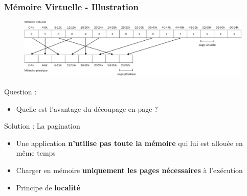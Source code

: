 \documentclass[8pt]{beamer}
\begin{document}
\begin{frame}[c]
    \frametitle{Mémoire Virtuelle - Illustration}
    \begin{figure}
        \centering

        \includegraphics[width=\textwidth]{figures/memoire_virtuelle_physique.pdf}
    \end{figure}
    \begin{alertblock}{Question : }
        \begin{itemize}
            \item
                  Quelle est l'avantage du d\'ecoupage en page ?
        \end{itemize}
    \end{alertblock}
    \pause
    \begin{exampleblock}{Solution : La pagination}
        \begin{itemize}
            \item Une application \textbf{n'utilise pas toute la mémoire} qui
                  lui est
                  allouée en même
                  temps
            \item Charger en mémoire \textbf{uniquement les pages nécessaires}
                  à
                  l'exécution
            \item Principe de \textbf{localité}
        \end{itemize}
    \end{exampleblock}

\end{frame}
\end{document}
